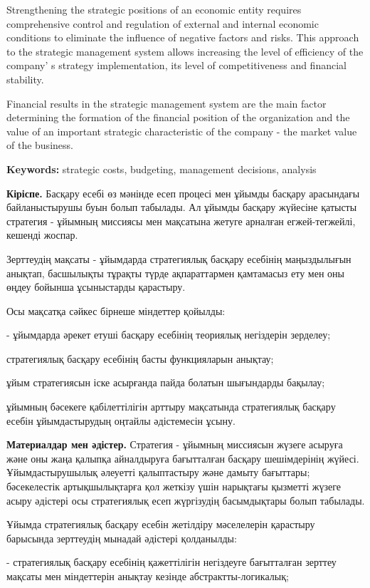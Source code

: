 Strengthening the strategic positions of an economic entity requires
comprehensive control and regulation of external and internal economic
conditions to eliminate the influence of negative factors and risks.
This approach to the strategic management system allows increasing the
level of efficiency of the company' s strategy
implementation, its level of competitiveness and financial stability.

Financial results in the strategic management system are the main factor
determining the formation of the financial position of the organization
and the value of an important strategic characteristic of the company -
the market value of the business.

{\bfseries Keywords:} strategic costs, budgeting, management decisions,
analysis

{\bfseries Кіріспе.} Басқару есебі өз мәнінде есеп процесі мен ұйымды
басқару арасындағы байланыстырушы буын болып табылады. Ал ұйымды басқару
жүйесіне қатысты стратегия - ұйымның миссиясы мен мақсатына жетуге
арналған егжей-тегжейлі, кешенді жоспар.

Зерттеудің мақсаты - ұйымдарда стратегиялық басқару есебінің
маңыздылығын анықтап, басшылықты тұрақты түрде ақпараттармен қамтамасыз
ету мен оны өңдеу бойынша ұсыныстарды қарастыру.

Осы мақсатқа сәйкес бірнеше міндеттер қойылды:

- ұйымдарда әрекет етуші басқару есебінің теориялық негіздерін зерделеу;

стратегиялық басқару есебінің басты функцияларын анықтау;

ұйым стратегиясын іске асырғанда пайда болатын шығындарды бақылау;

ұйымның бәсекеге қабілеттілігін арттыру мақсатында стратегиялық басқару
есебін ұйымдастырудың оңтайлы әдістемесін ұсыну.

{\bfseries Материалдар мен әдістер.} Стратегия - ұйымның миссиясын жүзеге
асыруға және оны жаңа қалыпқа айналдыруға бағытталған басқару
шешімдерінің жүйесі. Ұйымдастырушылық әлеуетті қалыптастыру және дамыту
бағыттары; бәсекелестік артықшылықтарға қол жеткізу үшін нарықтағы
қызметті жүзеге асыру әдістері осы стратегиялық есеп жүргізудің
басымдықтары болып табылады.

Ұйымда стратегиялық басқару есебін жетілдіру мәселелерін қарастыру
барысында зерттеудің мынадай әдістері қолданылды:


- стратегиялық басқару есебінің қажеттілігін негіздеуге бағытталған
зерттеу мақсаты мен міндеттерін анықтау кезінде абстрактты-логикалық;

